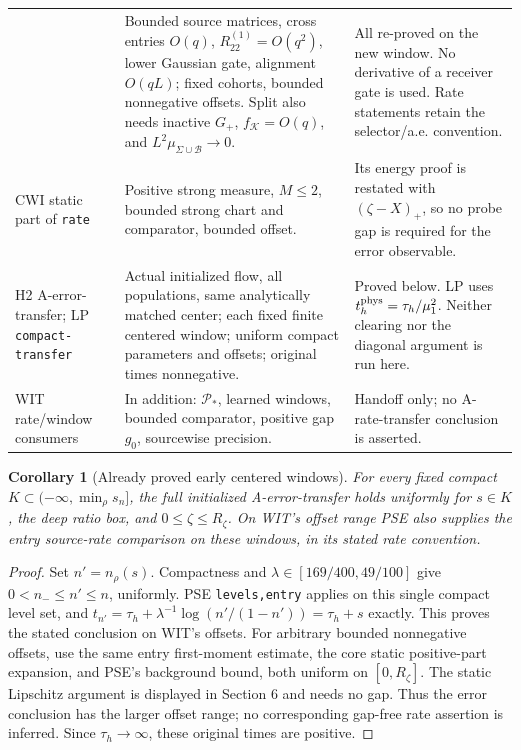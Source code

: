 \documentclass[11pt]{article}
\numberwithin{equation}{section}
\newtheorem{corollary}[theorem]{Corollary}
\newcommand{\KK}{\mathcal K}\newcommand{\BB}{\mathcal B}
\newcommand{\Gp}{G_+}\newcommand{\EE}{\mathfrak E}
\begin{document}
\begin{longtable}{>{\raggedright\arraybackslash}p{}
 >{\raggedright\arraybackslash}p{}
 >{\raggedright\arraybackslash}p{}}
& Bounded source matrices, cross entries \(O(q)\),
 \(R^{(1)}_{22}=O(q^2)\), lower Gaussian gate, alignment
 \(O(qL)\); fixed cohorts, bounded nonnegative offsets.
 Split also needs inactive \(\Gp\), \(f_\KK=O(q)\), and
 \(L^2\mu_{\Sigma\cup\BB}\to0\).
& All re-proved on the new window. No derivative of a receiver
 gate is used. Rate statements retain the selector/a.e. convention.\\
CWI static part of \texttt{rate}
& Positive strong measure, \(M\le2\), bounded strong chart
 and comparator, bounded offset.
& Its energy proof is restated with \((\zeta-X)_+\), so no
 probe gap is required for the error observable.\\
H2 A-error-transfer; LP \texttt{compact-transfer}
& Actual initialized flow, all populations, same analytically
 matched center; each fixed finite centered window; uniform
 compact parameters and offsets; original times nonnegative.
& Proved below. LP uses \(t_h^{\rm phys}=\tau_h/\mu_1^2\).
 Neither clearing nor the diagonal argument is run here.\\
WIT rate/window consumers
& In addition: \(\mathcal P_*\), learned windows, bounded
 comparator, positive gap \(g_0\), sourcewise precision.
& Handoff only; no A-rate-transfer conclusion is asserted.\\
\bottomrule
\end{longtable}\normalsize

\begin{corollary}[Already proved early centered windows]
\label{an07fwcv1:early}
For every fixed compact \(K\subset(-\infty,\min_\rho s_n]\),
the full initialized A-error-transfer holds uniformly for
\(s\in K\), the deep ratio box, and \(0\le\zeta\le R_\zeta\).
On WIT's offset range PSE also supplies the entry source-rate
comparison on these windows, in its stated rate convention.
\end{corollary}
\begin{proof}
Set \(n'=n_\rho(s)\). Compactness and \(\lambda\in[169/400,49/100]\)
give \(0<n_-\le n'\le n\), uniformly. PSE \texttt{levels,entry}
applies on this single compact level set, and
\(t_{n'}=\tau_h+\lambda^{-1}\log(n'/(1-n'))=\tau_h+s\)
exactly. This proves the stated conclusion on WIT's offsets.
For arbitrary bounded nonnegative offsets, use the same entry
first-moment estimate, the core static positive-part expansion,
and PSE's background bound, both uniform on \([0,R_\zeta]\).
The static Lipschitz argument is displayed in Section 6 and needs
no gap. Thus the error conclusion has the larger offset range;
no corresponding gap-free rate assertion is inferred.
Since \(\tau_h\to\infty\), these original times are positive.
\end{proof}
\end{document}

